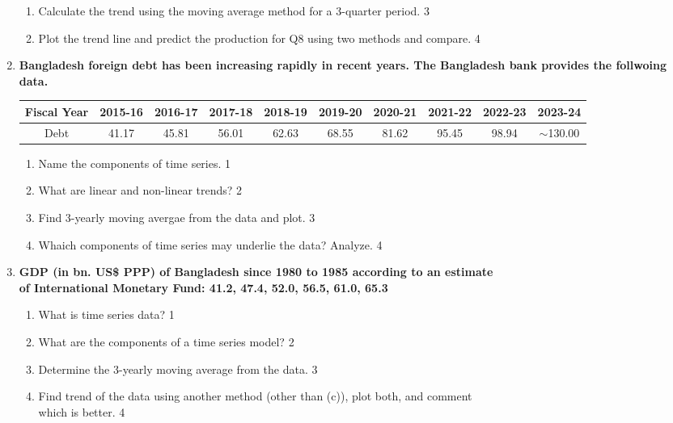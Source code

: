 \documentclass[a4paper,oneside]{book}
\begin{document}
\begin{enumerate}
\begin{enumerate}
\item
Calculate the trend using the moving average method for a 3-quarter period. \hfill 3
\item
Plot the trend line and predict the production for Q8 using two methods 
and compare. \hfill 4
\end{enumerate}


  
     \item
	  \textbf{Bangladesh foreign debt has been increasing rapidly in recent years. The Bangladesh bank provides the follwoing data.}
	  
	  \begin{table}[h]
	  \centering
\begin{tabular}{c|c|c|c|c|c|c|c|c|c}
Fiscal Year & 2015-16 & 2016-17 & 2017-18 & 2018-19 & 2019-20 & 2020-21 & 2021-22 & 2022-23 & 2023-24 \\ \hline
Debt & 41.17 & 45.81 & 56.01 & 62.63 & 68.55 & 81.62 & 95.45 & 98.94 & $\sim$130.00
\end{tabular}
\end{table}
  
  \begin{enumerate}
    \item
	Name the components of time series. \hfill 1
    \item
	What are linear and non-linear trends? \hfill 2
    \item  
	Find 3-yearly moving avergae from the data and plot. \hfill 3
    \item
	Whaich components of time series may underlie the data? Analyze. \hfill 4
  \end{enumerate}

 \item
	  \textbf{GDP (in bn. US\$ PPP) of Bangladesh since 1980 to 1985 according to an estimate \\ of International  Monetary Fund: 41.2, 47.4, 52.0, 56.5, 61.0, 65.3}
  \begin{enumerate}
    \item
	What is time series data? \hfill 1
    \item
	What are the components of a time series model? \hfill 2
    \item  
	Determine the 3-yearly moving average from the data. \hfill 3
    \item
	Find trend of the data using another method (other than (c)), plot both, and comment \\ which is better. \hfill 4
\end{enumerate}


\end{enumerate}
\end{document}
